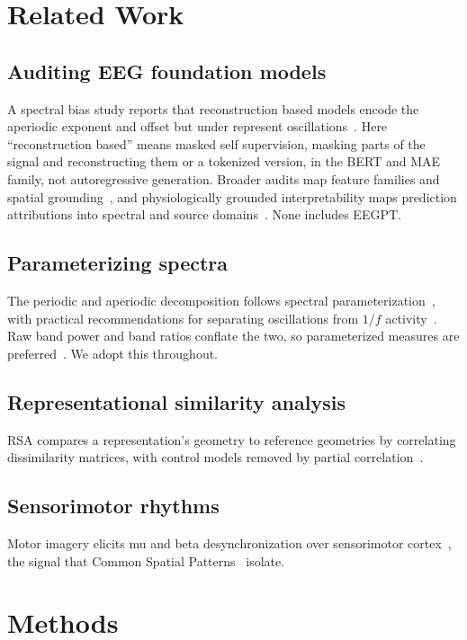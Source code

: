 \documentclass[journal]{IEEEtran}
\begin{document}
\section{Related Work}

\subsection{Auditing EEG foundation models}
A spectral bias study reports that reconstruction based models encode the
aperiodic exponent and offset but under represent
oscillations~\cite{spectralbias2026}. Here ``reconstruction based'' means masked
self supervision, masking parts of the signal and reconstructing them or a
tokenized version, in the BERT and MAE family, not autoregressive generation.
Broader audits map feature families and spatial
grounding~\cite{tang2026capture,beyondaccuracy2026}, and physiologically
grounded interpretability maps prediction attributions into spectral and source
domains~\cite{shama2026prism}. None includes EEGPT.

\subsection{Parameterizing spectra}
The periodic and aperiodic decomposition follows spectral
parameterization~\cite{donoghue2020specparam}, with practical recommendations
for separating oscillations from $1/f$ activity~\cite{gerster2022separating}. Raw
band power and band ratios conflate the two, so parameterized measures are
preferred~\cite{donoghue2020bandratio}. We adopt this throughout.

\subsection{Representational similarity analysis}
RSA compares a representation's geometry to reference geometries by correlating
dissimilarity matrices, with control models removed by partial
correlation~\cite{kriegeskorte2008rsa}.

\subsection{Sensorimotor rhythms}
Motor imagery elicits mu and beta desynchronization over sensorimotor
cortex~\cite{pfurtscheller1999erd}, the signal that Common Spatial
Patterns~\cite{blankertz2008csp} isolate.

\section{Methods}
\end{document}
